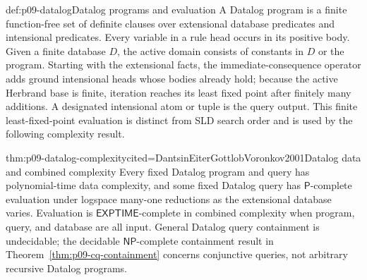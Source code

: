 \begin{hbdefinition}{def:p09-datalog}{Datalog programs and evaluation}
A Datalog program is a finite function-free set of definite clauses over
extensional database predicates and intensional predicates.  Every variable in
a rule head occurs in its positive body.  Given a finite database \(D\), the
active domain consists of constants in \(D\) or the program.  Starting with the
extensional facts, the immediate-consequence operator adds ground intensional
heads whose bodies already hold; because the active Herbrand base is finite,
iteration reaches its least fixed point after finitely many additions.  A
designated intensional atom or tuple is the query output.  This finite
least-fixed-point evaluation is distinct from SLD search order and is used by
the following complexity result.
\end{hbdefinition}

\begin{hbtheorem}{thm:p09-datalog-complexity}{cited=DantsinEiterGottlobVoronkov2001}{Datalog data and combined complexity}
Every fixed Datalog program and query has polynomial-time data complexity, and
some fixed Datalog query has \(\mathsf P\)-complete evaluation under logspace
many-one reductions as the extensional database varies.  Evaluation is
\(\mathsf{EXPTIME}\)-complete in combined complexity when program, query, and
database are all input.  General Datalog query containment is undecidable;
the decidable \(\mathsf{NP}\)-complete containment result in
Theorem~\ref{thm:p09-cq-containment} concerns conjunctive queries, not arbitrary
recursive Datalog programs.
\end{hbtheorem}

